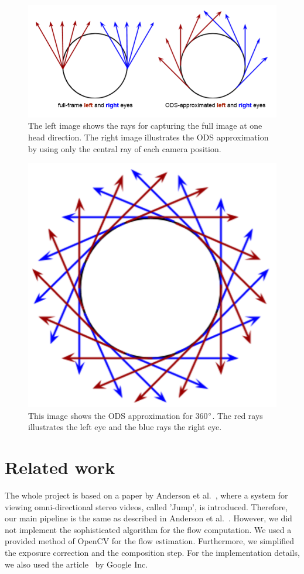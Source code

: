 \documentclass[10pt,twocolumn,letterpaper]{article}
\begin{document}
\begin{figure}[t]
\begin{center}
	\includegraphics[width=0.8\linewidth]{pictures/approxi.png}
\end{center}
   \caption{The left image shows the rays for capturing the full image at one head direction. The right image illustrates the ODS approximation by using only the central ray of each camera position.}
\label{fig:long}
\label{fig:onecol}
\end{figure}

\begin{figure}[t]
\begin{center}
   \includegraphics[width=0.5\linewidth]{pictures/ods.png}
\end{center}
   \caption{This image shows the ODS approximation for 360$\degree$. The red rays illustrates the left eye and the blue rays the right eye.}
\label{fig:long}
\label{fig:onecol}
\end{figure}


\section{Related work}
The whole project is based on a paper by Anderson et al.~\cite{jump16}, where a system for viewing omni-directional stereo videos, called 'Jump', is introduced. Therefore, our main pipeline is the same as described in Anderson et al.~\cite{jump16}. However, we did not implement the sophisticated algorithm for the flow computation. We used a provided method of OpenCV for the flow estimation. Furthermore, we simplified the exposure correction and the composition step. For the implementation details, we also used the article~\cite{ods} by Google Inc.
\end{document}
